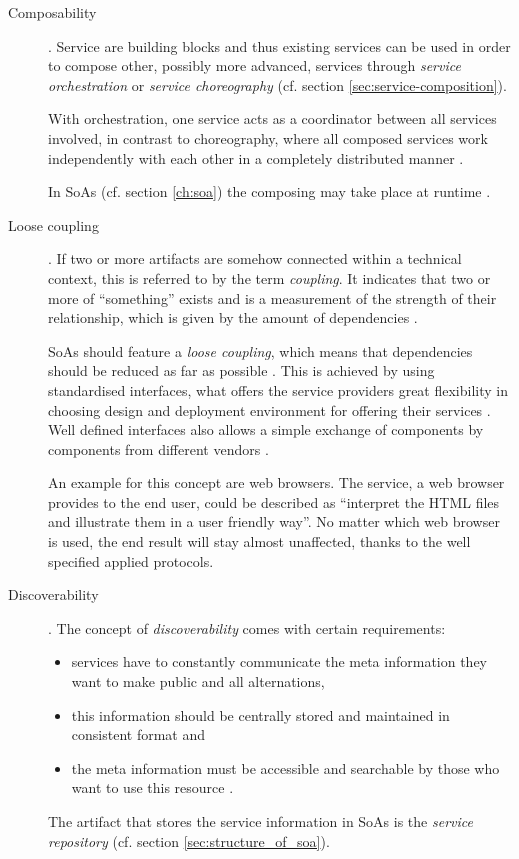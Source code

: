 \begin{description}
\item [Composability]. 
Service are building blocks and thus existing services can be used in order to compose other, possibly more advanced, services through \emph{service orchestration} or \emph{service choreography} (cf. section \ref{sec:service-composition}). 

With orchestration, one service acts as a coordinator between all services involved, in contrast to choreography, where all composed services work independently with each other in a completely distributed manner \cite{opengroup} \cite{arrowhead} \cite{breivold} \cite[p.27]{erl2011}.

In SoAs (cf. section \ref{ch:soa}) the composing may take place at runtime \cite{breivold}.

\item [Loose coupling].
If two or more artifacts are somehow connected within a technical context, this is referred to by the term \emph{coupling}. It indicates that two or more of ``something'' exists and is a measurement of the strength of their relationship, which is given by the amount of dependencies \cite{erl2008}.

SoAs should feature a \emph{loose coupling}, which means that dependencies should be reduced as far as possible \cite{erl2008}. This is achieved by using standardised interfaces, what offers the service providers great flexibility in choosing design and deployment environment for offering their services \cite{breivold} \cite{arrowhead}. Well defined interfaces also allows a simple exchange of components by components from different vendors \cite{scholz}.

An example for this concept are web browsers. The service, a web browser provides to the end user, could be described as ``interpret the HTML files and illustrate them in a user friendly way''. No matter which web browser is used, the end result will stay almost unaffected, thanks to the well specified applied protocols.

\item [Discoverability]. 
The concept of \emph{discoverability} comes with certain requirements:
	\begin{itemize}
	\item services have to constantly communicate the meta information they want to make public and all alternations,
	\item this information should be centrally stored and maintained in consistent format and
	\item the meta information must be accessible and searchable by those who want to use this resource \cite[ch.12.]{erl2008}.
	\end{itemize}
The artifact that stores the service information in SoAs is the \emph{service repository} (cf. section \ref{sec:structure_of_soa}).


\end{description}

